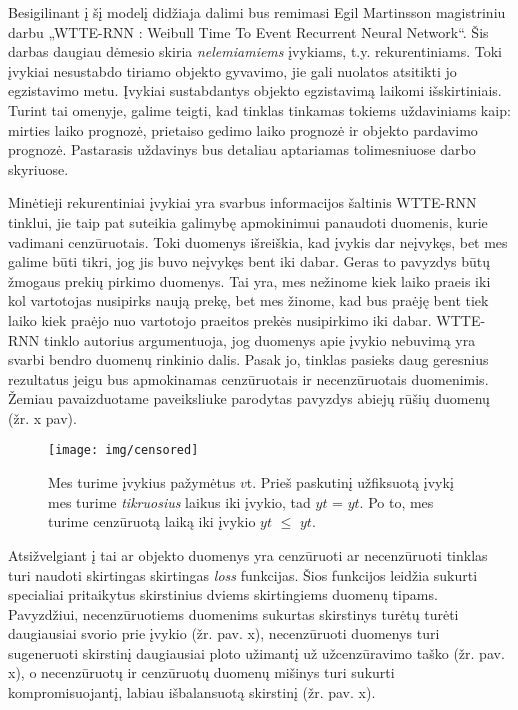 \documentclass{VUMIFPSkursinis}
\begin{document}
Besigilinant į šį modelį didžiaja dalimi bus remimasi Egil Martinsson magistriniu darbu „WTTE-RNN : Weibull Time To Event Recurrent Neural Network“. Šis darbas daugiau dėmesio skiria \textit{nelemiamiems} įvykiams, t.y. rekurentiniams. Toki įvykiai nesustabdo tiriamo objekto gyvavimo, jie gali nuolatos atsitikti jo egzistavimo metu. Įvykiai sustabdantys objekto egzistavimą laikomi išskirtiniais. Turint tai omenyje, galime teigti, kad tinklas tinkamas tokiems uždaviniams kaip: mirties laiko prognozė, prietaiso gedimo laiko prognozė ir objekto pardavimo prognozė. Pastarasis uždavinys bus detaliau aptariamas tolimesniuose darbo skyriuose.

Minėtieji rekurentiniai įvykiai yra svarbus informacijos šaltinis WTTE-RNN tinklui, jie taip pat suteikia galimybę apmokinimui panaudoti duomenis, kurie vadimani cenzūruotais. Toki duomenys išreiškia, kad įvykis dar neįvykęs, bet mes galime būti tikri, jog jis buvo neįvykęs bent iki dabar. Geras to pavyzdys būtų žmogaus prekių pirkimo duomenys. Tai yra, mes nežinome kiek laiko praeis iki kol vartotojas nusipirks naują prekę, bet mes žinome, kad bus praėję bent tiek laiko kiek praėjo nuo vartotojo praeitos prekės nusipirkimo iki dabar. WTTE-RNN tinklo autorius argumentuoja, jog duomenys apie įvykio nebuvimą yra svarbi bendro duomenų rinkinio dalis. Pasak jo, tinklas pasieks daug geresnius rezultatus jeigu bus apmokinamas cenzūruotais ir necenzūruotais duomenimis. Žemiau pavaizduotame paveiksliuke parodytas pavyzdys abiejų rūšių duomenų (žr. x pav).

\begin{figure}[H]
  \centering
  \texttt{[image: img/censored]}
  \caption{ Mes turime įvykius pažymėtus $v${\scriptsize t}. Prieš paskutinį užfiksuotą įvykį mes turime \textit{tikruosius} laikus iki įvykio, tad \~{$y$}{\scriptsize $t$} = $y${\scriptsize $t$}. Po to, mes turime cenzūruotą laiką iki įvykio \~{$y$}{\scriptsize $t$} $\leq$ {$y$}{\scriptsize $t$}\cite{WTTEBLOG}.}
  \label{img:censored}
\end{figure}

Atsižvelgiant į tai ar objekto duomenys yra cenzūruoti ar necenzūruoti tinklas turi naudoti skirtingas skirtingas \textit{loss} funkcijas. Šios funkcijos leidžia sukurti specialiai pritaikytus skirstinius dviems skirtingiems duomenų tipams. Pavyzdžiui, necenzūruotiems duomenims sukurtas skirstinys turėtų turėti daugiausiai svorio prie įvykio (žr. pav. x), necenzūruoti duomenys turi sugeneruoti skirstinį daugiausiai ploto užimantį už užcenzūravimo taško (žr. pav. x), o necenzūruotų ir cenzūruotų duomenų mišinys turi sukurti kompromisuojantį, labiau išbalansuotą skirstinį (žr. pav. x).  
\end{document}
